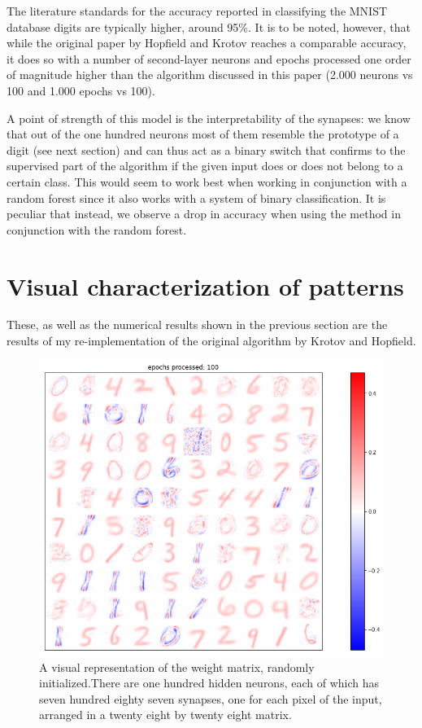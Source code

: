 \documentclass[a4paper]{report}
\begin{document}
The literature standards for the accuracy reported in classifying the MNIST database digits are typically higher, around 95\%.
It is to be noted, however, that while the original paper by Hopfield and Krotov reaches a comparable accuracy, it does so with a number of second-layer neurons and epochs processed one order of magnitude higher than the algorithm discussed in this paper (2.000 neurons vs 100 and 1.000 epochs vs 100).

A point of strength of this model is the interpretability of the synapses:
we know that out of the one hundred neurons most of them resemble the prototype of a digit (see next section) and can thus act as a binary switch that confirms to the supervised part of the algorithm if the given input does or does not belong to a certain class.
This would seem to work best when working in conjunction with a random forest since it also works with a system of binary classification.
It is peculiar that instead, we observe a drop in accuracy when using the method in conjunction with the random forest.

\section{Visual characterization of patterns}
These, as well as the numerical results shown in the previous section are the results of my re-implementation of the original algorithm by Krotov and Hopfield.


\begin{figure} [H]
    \centering
    \includegraphics [width=12cm ] {h/uu_heatmap.png}
    \caption{A visual representation of the weight matrix, randomly initialized.There are one hundred hidden neurons, each of which has seven hundred eighty seven synapses, one for each pixel of the input, arranged in a twenty eight by twenty eight matrix.}
    \label{heatmap}
\end{figure}
\end{document}
